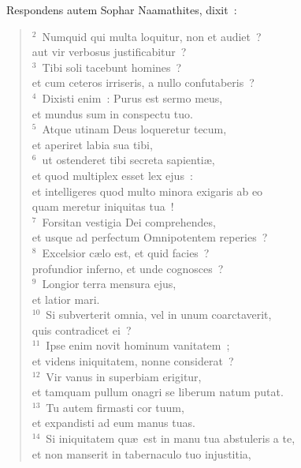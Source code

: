 ~\lettrine[lines=10,image=true,loversize=0.05,lraise=-0.03]{R}{}espondens autem Sophar Naamathites, dixit~:
\begin{flushleft}\begin{verse}\vspace{6pt}${}^{2}$~Numquid qui multa loquitur, non et audiet~?\\ aut vir verbosus justificabitur~?\\
${}^{3}$~Tibi soli tacebunt homines~?\\ et cum ceteros irriseris, a nullo confutaberis~?\\
${}^{4}$~Dixisti enim~: Purus est sermo meus,\\ et mundus sum in conspectu tuo.\\
${}^{5}$~Atque utinam Deus loqueretur tecum,\\ et aperiret labia sua tibi,\\
${}^{6}$~ut ostenderet tibi secreta sapienti\ae ,\\ et quod multiplex esset lex ejus~:\\ et intelligeres quod multo minora exigaris ab eo\\ quam meretur iniquitas tua~!\\
${}^{7}$~Forsitan vestigia Dei comprehendes,\\ et usque ad perfectum Omnipotentem reperies~?\\
${}^{8}$~Excelsior c\ae lo est, et quid facies~?\\ profundior inferno, et unde cognosces~?\\
${}^{9}$~Longior terra mensura ejus,\\ et latior mari.\\
${}^{10}$~Si subverterit omnia, vel in unum coarctaverit,\\ quis contradicet ei~?\\
${}^{11}$~Ipse enim novit hominum vanitatem~;\\ et videns iniquitatem, nonne considerat~?\\
${}^{12}$~Vir vanus in superbiam erigitur,\\ et tamquam pullum onagri se liberum natum putat.\\
${}^{13}$~Tu autem firmasti cor tuum,\\ et expandisti ad eum manus tuas.\\
${}^{14}$~Si iniquitatem qu\ae\ est in manu tua abstuleris a te,\\ et non manserit in tabernaculo tuo injustitia,\\

\end{verse}
\end{flushleft}
